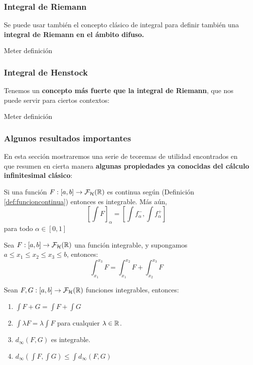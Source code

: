 \subsubsection{Integral de Riemann}
Se puede usar también el concepto clásico de integral para definir también una \textbf{integral de Riemann en el ámbito difuso.}

\begin{definicion}
Meter definición
\end{definicion}

\subsubsection{Integral de Henstock}
Tenemos un \textbf{concepto más fuerte que la integral de Riemann}, que nos puede servir para ciertos contextos:
\begin{definicion}
	Meter definición
\end{definicion}

\subsubsection{Algunos resultados importantes}
En esta sección mostraremos una serie de teoremas de utilidad encontrados en \cite{integral2} que resumen en cierta manera \textbf{algunas propiedades ya conocidas del cálculo infinitesimal clásico}:

\begin{teorema}
	Si una función $F :  [a, b] \rightarrow \mathcal{F}_\mathcal{H}(\mathbb R)$ es continua según (Definición \ref{def:funcioncontinua}) entonces es integrable. Más aún,
	\[
		\left[
			\int F
		\right]_\alpha = \left[
			\int f_\alpha^-, \int f_\alpha^+
		\right]
	\] para todo $\alpha \in [0, 1]$
\end{teorema}

\begin{teorema}
	Sea $F :  [a, b] \rightarrow \mathcal{F}_\mathcal{H}(\mathbb R)$ una función integrable, y supongamos $a \leq x_1 \leq x_2 \leq x_3 \leq b$, entonces:
	\[
		\int_{x_1}^{x_3} F = \int_{x_1}^{x_2} F + \int_{x_2}^{x_3} F
	\]
\end{teorema}

\begin{teorema}
	Sean $F, G :  [a, b] \rightarrow \mathcal{F}_\mathcal{H}(\mathbb R)$ funciones integrables, entonces:
	
	\begin{enumerate}
		\item $\int F + G = \int F + \int G$
		\item $\int \lambda F = \lambda \int F$ para cualquier $\lambda \in \mathbb R$.
		\item $d_\infty(F, G)$ es integrable.
		\item $d_\infty(\int F, \int G) \leq \int d_\infty(F, G)$
	\end{enumerate}
\end{teorema}

